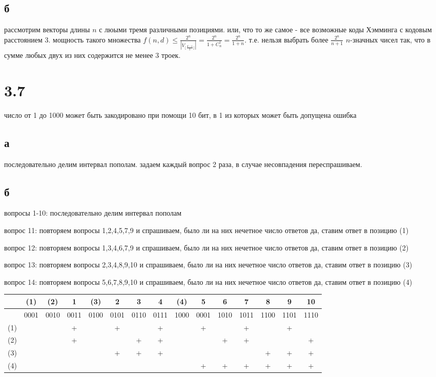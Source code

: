 \documentclass[russian]{article}
\begin{document}
\subsection*{б} 

рассмотрим векторы длины $n$ с люыми тремя различными позициями. или, что то же самое - все возможные коды Хэмминга с кодовым расстоянием 3. мощность такого множества $f(n,d)\le\frac{2^n}{|V_{\lfloor \frac{d-1}{2} \rfloor}|} = \frac{2^n}{1+C_n^1}=\frac{2^n}{1+n}$. т.е. нельзя выбрать более $\frac{2^n}{n+1}$ $n$-значных чисел так, что в сумме любых двух из них содержится не менее  3 троек.

\section*{3.7}

число от 1 до 1000 может быть закодировано при помощи 10 бит, в 1 из которых может быть допущена ошибка

\subsection*{а}
последовательно делим интервал пополам. задаем каждый вопрос 2 раза, в случае несовпадения переспрашиваем.

\subsection*{б}

вопросы 1-10: последовательно делим интервал пополам

вопрос 11: повторяем вопросы 1,2,4,5,7,9 и спрашиваем, было ли на них нечетное число ответов да, ставим ответ в позицию (1)

вопрос 12: повторяем вопросы 1,3,4,6,7,9 и спрашиваем, было ли на них нечетное число ответов да, ставим ответ в позицию (2)

вопрос 13: повторяем вопросы 2,3,4,8,9,10 и спрашиваем, было ли на них нечетное число ответов да, ставим ответ в позицию (3)

вопрос 14: повторяем вопросы 5,6,7,8,9,10 и спрашиваем, было ли на них нечетное число ответов да, ставим ответ в позицию (4)

{
\tiny
\begin{tabular}{|c|c|c|c|c|c|c|c|c|c|c|c|c|c|c|} \hline
& (1) & (2) & 1 & (3) & 2 & 3 & 4 & (4) & 5 & 6 & 7 & 8 & 9 & 10 \\\hline
& 0001 & 0010 & 0011 & 0100 & 0101 & 0110 & 0111 & 1000 & 0001 & 1010 & 1011 & 1100 & 1101 & 1110 \\\hline
(1) & & & + & & + &   & + & & + &   & + &   & + &   \\\hline
(2) & & & + & &   & + & + & &   & + & + &   &   & + \\\hline
(3) & & &   & & + & + & + & &   &   &   & + & + & + \\\hline
(4) & & &   & &   &   &   & & + & + & + & + & + & + \\\hline
\end{tabular}
}
\end{document}
